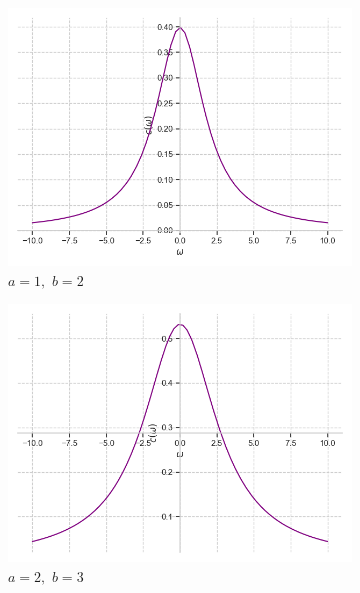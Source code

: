 \documentclass[a4paper, 16pt]{article}
\begin{document}
    \begin{figure}[htbp]
        \centering
        \begin{subfigure}{0.3\textwidth}
            \centering
            \includegraphics[width=\linewidth]{doatfimg_a=1_b=2.png}
            \caption{$a=1,\,\,b=2$}
            \label{fig:doatfimg_1}
        \end{subfigure}
        \hfill
        \begin{subfigure}{0.3\textwidth}
            \centering
            \includegraphics[width=\linewidth]{doatfimg_a=2_b=3.png}
            \caption{$a=2,\,\,b=3$}
            \label{fig:doatfimg_2}
        \end{subfigure}
        \hfill
        \begin{subfigure}{0.3\textwidth}

\end{subfigure}
\end{figure}
\end{document}
